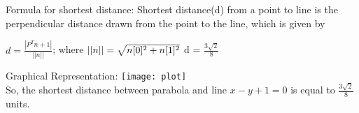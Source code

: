 \documentclass{beamer}
\begin{document}
\begin{frame}{Formula for shortest distance:}
\starShortest Shortest distance(d) from a point to line is the perpendicular distance drawn from the point to the line, which is given by
\begin{center}

$d = \frac{|P^Tn + 1|}{||n||}$;
 where $||n|| = \sqrt{n[0]^2 + n[1]^2}\\$
d = \(\frac{3\sqrt{2}}{8}\)
\end{center}
\end{frame}


\begin{frame}{Graphical Representation:}
\texttt{[image: plot]}\\
So, the shortest distance between parabola and line $x - y + 1 = 0$ is equal to $\frac{3\sqrt{2}}{8}\ $ units.
\end{frame}
\end{document}
